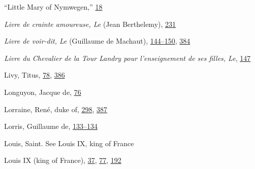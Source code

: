 ``Little Mary of Nymwegen,''
\protect\hyperlink{08_Chapter_One__THE_PASSIONATE_INTE.xhtmlux5cux23page_18}{18}

\emph{Livre de crainte amoureuse, Le} (Jean Berthelemy),
\protect\hyperlink{15_Chapter_Eight__RELIGIOUS_EXCITAT.xhtmlux5cux23page_231}{231}

\emph{Livre de voir-dit, Le} (Guillaume de Machaut),
\protect\hyperlink{11_Chapter_Four__THE_FORMS_OF_LOVE.xhtmlux5cux23page_144}{144--}\protect\hyperlink{11_Chapter_Four__THE_FORMS_OF_LOVE.xhtmlux5cux23page_150}{150},
\protect\hyperlink{22_Chapter_Fourteen__THE_COMING_OF.xhtmlux5cux23page_384}{384}

\emph{Livre du Chevalier de la Tour Landry pour l'enseignement de ses
filles, Le},
\protect\hyperlink{11_Chapter_Four__THE_FORMS_OF_LOVE.xhtmlux5cux23page_147}{147}

Livy, Titus,
\protect\hyperlink{10_Chapter_Three__THE_HEROIC_DREAM.xhtmlux5cux23page_78}{78},
\protect\hyperlink{22_Chapter_Fourteen__THE_COMING_OF.xhtmlux5cux23page_386}{386}

Longuyon, Jacque de,
\protect\hyperlink{10_Chapter_Three__THE_HEROIC_DREAM.xhtmlux5cux23page_76}{76}

Lorraine, René, duke of,
\protect\hyperlink{20_ILLUSTRATIONS_FOLLOW_PAGE.xhtmlux5cux23page_298}{298},
\protect\hyperlink{22_Chapter_Fourteen__THE_COMING_OF.xhtmlux5cux23page_387}{387}

Lorris, Guillaume de,
\protect\hyperlink{11_Chapter_Four__THE_FORMS_OF_LOVE.xhtmlux5cux23page_133}{133--}\protect\hyperlink{11_Chapter_Four__THE_FORMS_OF_LOVE.xhtmlux5cux23page_134}{134}

Louis, Saint. See Louis IX, king of France

Louis IX (king of France),
\protect\hyperlink{09_Chapter_Two__THE_CRAVING_FOR_A_M.xhtmlux5cux23page_37}{37},
\protect\hyperlink{10_Chapter_Three__THE_HEROIC_DREAM.xhtmlux5cux23page_77}{77},
\protect\hyperlink{13_Chapter_Six__THE_DEPICTION_OF_TH.xhtmlux5cux23page_192}{192}


